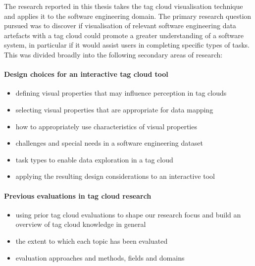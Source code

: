 The research reported in this thesis takes the tag cloud visualisation technique and applies it to the software engineering domain. The primary research question pursued was to discover if visualisation of relevant software engineering data artefacts with a tag cloud could promote a greater understanding of a software system, in particular if it would assist users in completing specific types of tasks. This was divided broadly into the following secondary areas of research:

\pagebreak

\paragraph{Design choices for an interactive tag cloud tool}
\begin{itemize} 
\item defining visual properties that may influence perception in tag clouds
\item selecting visual properties that are appropriate for data mapping 
\item how to appropriately use characteristics of visual properties
\item challenges and special needs in a software engineering dataset
\item task types to enable data exploration in a tag cloud
\item applying the resulting design considerations to an interactive tool
\end{itemize} 

\paragraph{Previous evaluations in tag cloud research}
\begin{itemize}
\item using prior tag cloud evaluations to shape our research focus and build an overview of tag cloud knowledge in general
\item the extent to which each topic has been evaluated
\item evaluation approaches and methods, fields and domains
\end{itemize} 

